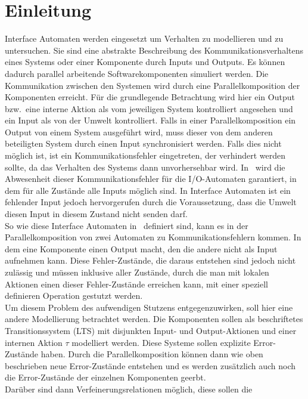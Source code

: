 \chapter{Einleitung}

Interface Automaten werden eingesetzt um Verhalten zu modellieren und zu
untersuchen. Sie sind eine abstrakte Beschreibung des Kommunikationsverhaltens
eines Systems oder einer Komponente durch Inputs und Outputs. Es können dadurch
parallel arbeitende Softwarekomponenten simuliert werden. Die Kommunikation
zwischen den Systemen wird durch eine Parallelkomposition der Komponenten
erreicht. Für die grundlegende Betrachtung wird hier ein Output bzw.\ eine
interne Aktion als vom jeweiligen System
kontrolliert angesehen und ein Input als von der Umwelt kontrolliert. Falls in
einer Parallelkomposition ein Output von einem System ausgeführt wird, muss
dieser von dem anderen beteiligten System durch einen
Input synchronisiert werden. Falls dies nicht möglich ist, ist ein
Kommunikationsfehler eingetreten, der verhindert werden sollte, da das
Verhalten des Systems dann unvorhersehbar wird. In~\cite{Lynch1996} wird die
Abwesenheit dieser Kommunikationsfehler
für die I/O-Automaten garantiert, in dem für alle Zustände alle Inputs möglich
sind. In Interface Automaten ist ein fehlender Input jedoch hervorgerufen durch
die Voraussetzung, dass die Umwelt diesen Input in diesem Zustand nicht senden
darf.\\
So wie diese Interface Automaten in~\cite{Alfaro2004} definiert sind, kann es
in der Parallelkomposition von zwei Automaten zu Kommunikationsfehlern kommen.
In dem eine Komponente einen Output macht, den die andere nicht als Input
aufnehmen kann. Diese Fehler-Zustände, die daraus entstehen sind jedoch nicht
zulässig und müssen inklusive aller Zustände, durch die man mit lokalen
Aktionen einen dieser Fehler-Zustände erreichen kann, mit einer speziell definieren
Operation gestutzt werden.\\
Um diesem Problem des aufwendigen Stutzens entgegenzuwirken, soll hier eine
andere Modellierung betrachtet werden. Die Komponenten sollen als beschriftetes
Transitionssystem (LTS) mit disjunkten Input- und Output-Aktionen und einer
internen Aktion $\tau$ modelliert werden. Diese Systeme sollen explizite
Error-Zustände haben. Durch die Parallelkomposition können dann wie oben
beschrieben neue Error-Zustände entstehen und es werden zusätzlich auch noch die
Error-Zustände der einzelnen Komponenten geerbt.\\
Darüber sind dann Verfeinerungsrelationen möglich, diese sollen die
